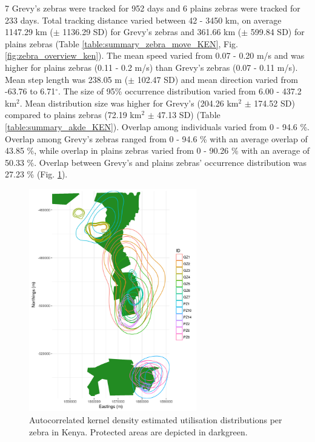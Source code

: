 \documentclass[12pt,a4paper, twoside, english]{article}
\begin{document}
7 Grevy's zebras were tracked for 952 days and 6 plains zebras were tracked for 233 days. Total tracking distance varied between 42 - 3450 km, on average 1147.29 km ($\pm$ 1136.29 SD) for Grevy's zebras and 361.66 km ($\pm$ 599.84 SD) for plains zebras (Table \ref{table:summary_zebra_move_KEN}, Fig. \ref{fig:zebra_overview_ken}). The mean speed varied from 0.07 - 0.20 m/s and was higher for plains zebras (0.11 - 0.2 m/s) than Grevy's zebras (0.07 - 0.11 m/s). Mean step length was 238.05 m ($\pm$ 102.47 SD) and mean direction varied from -63.76 to 6.71$^\circ$. The size of 95\% occurrence distribution varied from 6.00 - 437.2 km$^2$. Mean distribution size was higher for Grevy's (204.26 km$^2$ $\pm$ 174.52 SD) compared to plains zebras (72.19 km$^2$ $\pm$ 47.13 SD) (Table \ref{table:summary_akde_KEN}). Overlap among individuals varied from 0 - 94.6 \%. Overlap among Grevy's zebras ranged from 0 - 94.6 \% with an average overlap of 43.85 \%, while overlap in plains zebras varied from 0 - 90.26 \% with an average of 50.33 \%. Overlap between Grevy's and plains zebras' occurrence distribution was 27.23 \% (Fig. \ref{fig:akde_KEN}).

\begin{figure}[H]
  \centering
  \includegraphics[width=0.65\textwidth]{figures/AKDE_KEN.png}
  \caption[AKDE distribution of Laikipia zebras]{Autocorrelated kernel density estimated utilisation distributions per zebra in Kenya. Protected areas are depicted in darkgreen.}
  \label{fig:akde_KEN}
\end{figure}
\end{document}
